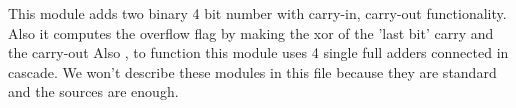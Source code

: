 This module adds two binary 4 bit number with carry-in, carry-out functionality. Also it computes the overflow flag by making the xor of the 'last bit' carry and the carry-out
Also , to function this module uses 4 single full adders connected in 	
cascade. We won't describe these modules in this file because they are standard and the sources are enough.


